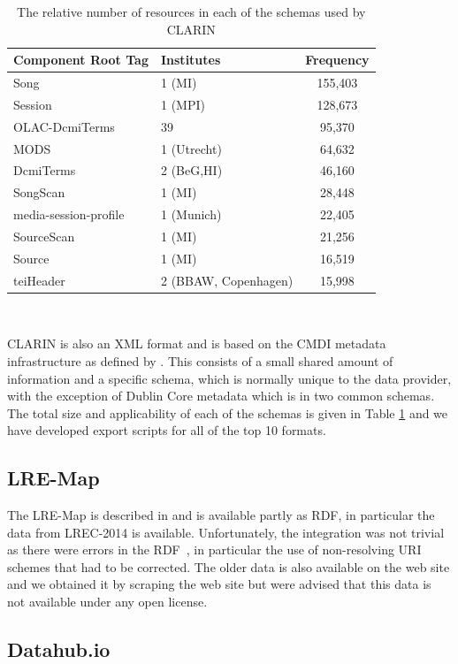 \documentclass[smallextended]{svjour3}       %
\begin{document}
\begin{table}
\begin{tabular}{l|lc}
Component Root Tag & Institutes & Frequency \\
\hline
Song & 1 (MI) & 155,403 \\
Session & 1 (MPI) & 128,673 \\
OLAC-DcmiTerms & 39 & 95,370 \\
MODS & 1 (Utrecht)& 64,632 \\
DcmiTerms & 2 (BeG,HI) & 46,160 \\
SongScan & 1 (MI) & 28,448 \\
media-session-profile & 1 (Munich) & 22,405 \\
SourceScan & 1 (MI) & 21,256 \\
Source & 1 (MI) & 16,519 \\
teiHeader & 2 (BBAW, Copenhagen) & 15,998 \\
\end{tabular}
\

    \caption{\label{tab:clarin-resources}The relative number of resources in
    each of the schemas used by CLARIN}
\end{table}

CLARIN is also an XML format and is based on the CMDI metadata infrastructure as
defined by \cite{broeder2012cmdi}. This consists of a small shared amount of information and
a specific schema, which is normally unique to the data provider, with the
exception of Dublin Core metadata which is in two common schemas. The total size
and applicability of each of the schemas is given in Table
\ref{tab:clarin-resources} and we have developed export scripts for all of the
top 10 formats.

\subsection{LRE-Map}

The LRE-Map is described in \cite{calzolari2012lre} and is available partly as RDF, in
particular the data from LREC-2014 is available. Unfortunately, the integration
was not trivial as there were errors in the RDF~\cite{del2014lre}, in particular the use of
non-resolving URI schemes that had to be corrected. The older data is also
available on the web site and we obtained it by scraping the web site but were
advised that this data is not available under any open license.

\subsection{Datahub.io}
\end{document}
